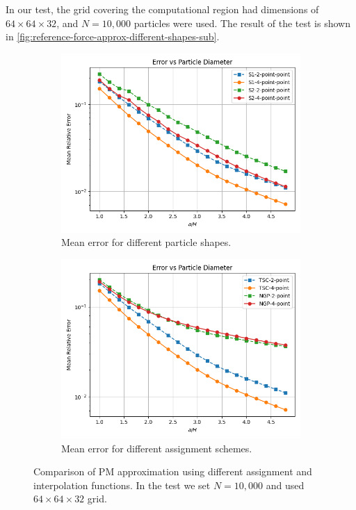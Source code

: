 In our test, the grid covering the computational region had dimensions of $64\times 64\times 32$, and $N=10{,}000$ particles were used.
The result of the test is shown in \autoref{fig:reference-force-approx-different-shapes-sub}.
\begin{figure}[!ht]
    \centering
    \begin{subfigure}[b]{0.48\textwidth}
        \centering
        \includegraphics[width=\textwidth]{chapters/p3m-method/img/err_vs_part_diam_p3m.png}
        \caption{Mean error for different particle shapes.}
        \label{fig:reference-force-approx-different-shapes-sub}
    \end{subfigure}
    \hfill
    \begin{subfigure}[b]{0.48\textwidth}
        \centering
        \includegraphics[width=\textwidth]{chapters/p3m-method/img/no-cic.png}
        \caption{Mean error for different assignment schemes.}
        \label{fig:reference-force-error-different-schemes-sub}
    \end{subfigure}
    \caption{Comparison of PM approximation using different assignment and interpolation functions.
    In the test we set $N=10{,}000$ and used $64\times 64\times 32$ grid.
    }
    \label{fig:p3m-global-err-combined}
\end{figure}
